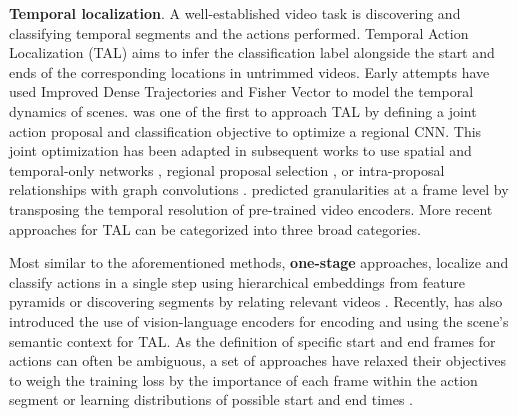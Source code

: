 \documentclass[smallextended,twocolumn,natbib]{svjour3}
\begin{document}
\noindent
\textbf{Temporal localization}. A well-established video task is discovering and classifying temporal segments and the actions performed. Temporal Action Localization (TAL) aims to infer the classification label alongside the start and ends of the corresponding locations in untrimmed videos. Early attempts have used Improved Dense Trajectories \citep{wang2013action} and Fisher Vector \citep{oneata2013action} to model the temporal dynamics of scenes. \citet{shou2016temporal} was one of the first to approach TAL by defining a joint action proposal and classification objective to optimize a regional CNN. This joint optimization has been adapted in subsequent works to use spatial and temporal-only networks \citep{lin2018bsn,paul2018w,wang2017untrimmednets}, regional proposal selection \citep{chao2018rethinking,xu2017r}, or intra-proposal relationships with graph convolutions \citep{zeng2019graph}. \citet{shou2017cdc} predicted granularities at a frame level by transposing the temporal resolution of pre-trained video encoders. More recent approaches for TAL can be categorized into three broad categories. 

Most similar to the aforementioned methods, \textbf{one-stage} approaches, localize and classify actions in a single step using hierarchical embeddings from feature pyramids \citep{lin2021learning,liu2020progressive,shi2023tridet,zhang2022actionformer} or discovering segments by relating relevant videos \citep{shou2018autoloc,yang2020localizing}. Recently, \citet{yan2023unloc} has also introduced the use of vision-language encoders for encoding and using the scene's semantic context for TAL. As the definition of specific start and end frames for actions can often be ambiguous, a set of approaches have relaxed their objectives to weigh the training loss by the importance of each frame within the action segment \citep{shao2023action} or
learning distributions of possible start and end times \citep{moltisanti2019action}. 
\end{document}
